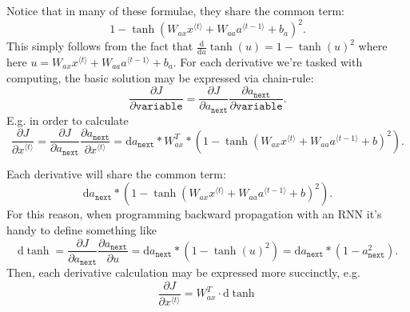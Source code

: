 \documentclass[12pt]{article}
\newcommand{\D}{\mathrm{d}}
\begin{document}
Notice that in many of these formulae, they share the common term:
\[
  1 - \tanh(W_{ax} x^{\langle t \rangle} + W_{aa} a^{\langle t-1 \rangle} + b_a)^2.
\]
This simply follows from the fact that $\frac{\D}{\D u} \tanh(u) = 1 - \tanh(u)^2$ where here $u = W_{ax} x^{\langle t \rangle} + W_{aa} a^{\langle t -1 \rangle} + b_a$. For each derivative we're tasked with computing, the basic solution may be expressed via chain-rule:
\[
\frac{\partial J}{\partial \texttt{variable}} = \frac{\partial J}{\partial a_{\texttt{next}}} \frac{\partial a_{\texttt{next}}}{\partial \texttt{variable}}.
\]
E.g. in order to calculate
\[
  \frac{\partial J}{\partial x^{\langle t \rangle}} = \frac{\partial J }{\partial a_{\texttt{next}}} \frac{\partial a_{\texttt{next}}}{\partial x^{\langle t \rangle}} = \D a_{\texttt{next}} * W_{ax}^T * \left(1 - \tanh(W_{ax} x^{\langle t \rangle} + W_{aa} a^{\langle t - 1 \rangle} + b)^2\right).
\]

Each derivative will share the common term:
\[
  \D a_{\texttt{next}} * (1 - \tanh(W_{ax} x^{\langle t \rangle} + W_{aa} a^{\langle t - 1 \rangle} + b)^2).
\]
For this reason, when programming backward propagation with an RNN it's handy to define something like
\[
  \D \tanh = \frac{\partial J}{\partial a_{\texttt{next}}} \frac{\partial a_{\texttt{next}}}{\partial u} = \D a_{\texttt{next}} * (1 - \tanh(u)^2 ) = \D a_{\texttt{next}} * (1 - a_{\texttt{next}}^2).
\]
Then, each derivative calculation may be expressed more succinctly, e.g.
\[
  \frac{\partial J}{\partial x^{\langle t \rangle}} = W_{ax}^T \cdot \D \tanh
\]
\end{document}
